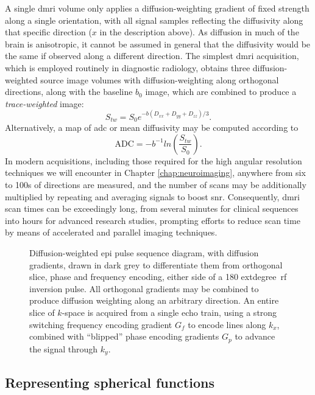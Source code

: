 A single \gls{dmri} volume only applies a diffusion-weighting gradient of fixed strength along a single orientation, with all signal samples reflecting the diffusivity along that specific direction ($x$ in the description above).
As diffusion in much of the brain is anisotropic, it cannot be assumed in general that the diffusivity would be the same if observed along a different direction.
The simplest \gls{dmri} acquisition, which is employed routinely in diagnostic radiology, obtains three diffusion-weighted source image volumes with diffusion-weighting along orthogonal directions, along with the baseline $b_0$ image, which are combined to produce a \textit{trace-weighted} image:
\begin{equation}
  S_{tw} = S_0 e^{-b(D_{xx} + D_{yy} + D_{zz})/3}. \label{eq:trace}
\end{equation}
Alternatively, a map of \gls{adc} or mean diffusivity may be computed according to
\begin{equation}
  \text{ADC} = -b^{-1} ln (\frac{S_{tw}}{S_0}). \label{eq:adc}
\end{equation}
In modern acquisitions, including those required for the high angular resolution techniques we will encounter in Chapter \ref{chap:neuroimaging}, anywhere from six to 100s of directions are measured, and the number of scans may be additionally multiplied by repeating and averaging signals to boost \gls{snr}.
Consequently, \gls{dmri} scan times can be exceedingly long, from several minutes for clinical sequences into hours for advanced research studies, prompting efforts to reduce scan time by means of accelerated and parallel imaging techniques.

\begin{figure}
  
  \caption[Diffusion-weighted EPI pulse sequence diagram]{Diffusion-weighted \gls{epi} pulse sequence diagram, with diffusion gradients, drawn in dark grey to differentiate them from orthogonal slice, phase and frequency encoding, either side of a 180	extdegree\ \gls{rf} inversion pulse. All orthogonal gradients may be combined to produce diffusion weighting along an arbitrary direction. An entire slice of $k$-space is acquired from a single echo train, using a strong switching frequency encoding gradient $G_f$ to encode lines along $k_x$, combined with ``blipped'' phase encoding gradients $G_p$ to advance the signal through $k_y$.}
  \label{fig:dwepi}
\end{figure}

\subsection{Representing spherical functions}
\label{sec:sh}

